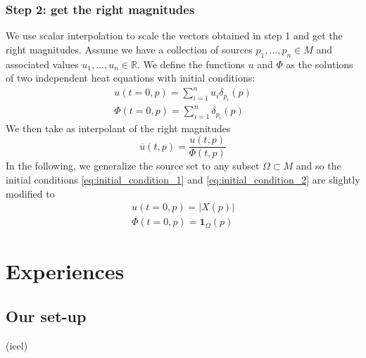 \documentclass[sigconf]{acmart}
\begin{document}
\subsubsection{Step 2: get the right magnitudes}
We use scalar interpolation to scale the vectors obtained in step 1 and get the right magnitudes. Assume we have a collection of sources
$p_1, \dots, p_n \in M$ and associated values $u_1, \dots, u_n \in \mathbb{R}$. We define the functions $u$ and $\Phi$ 
as the solutions of two independent heat equations with initial conditions:
\begin{align}
  u(t = 0, p) = \sum_{i = 1}^nu_i\delta_{p_i}(p) \label{eq:initial_condition_1}\\
  \Phi(t = 0, p) = \sum_{i=1}^n\delta_{p_i}(p) \label{eq:initial_condition_2}
\end{align}
We then take as interpolant of the right magnitudes 
\begin{equation}
  \overline{u}(t,p) = \frac{u(t,p)}{\Phi(t,p)}
\end{equation}
In the following, we generalize the source set to any subset $\Omega \subset M$
and so the initial conditions \ref{eq:initial_condition_1} and \ref{eq:initial_condition_2}
are slightly modified to 
\begin{align*}
  u(t=0, p) = | X(p) | \\
  \Phi(t=0, p) = \mathbf{1}_{\Omega}(p)
\end{align*}

\section{Experiences}

\subsection{Our set-up}
(icel)
\end{document}
